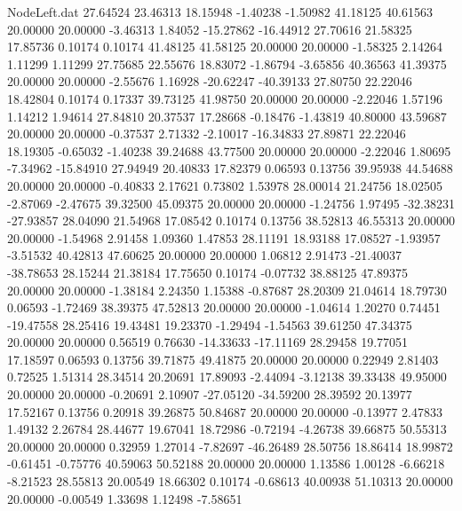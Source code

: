 \begin{filecontents}{NodeLeft.dat}
  27.64524   23.46313   18.15948    -1.40238   -1.50982   41.18125   40.61563   20.00000   20.00000   -3.46313    1.84052  -15.27862  -16.44912
  27.70616   21.58325   17.85736     0.10174    0.10174   41.48125   41.58125   20.00000   20.00000   -1.58325    2.14264    1.11299    1.11299
  27.75685   22.55676   18.83072    -1.86794   -3.65856   40.36563   41.39375   20.00000   20.00000   -2.55676    1.16928  -20.62247  -40.39133
  27.80750   22.22046   18.42804     0.10174    0.17337   39.73125   41.98750   20.00000   20.00000   -2.22046    1.57196    1.14212    1.94614
  27.84810   20.37537   17.28668    -0.18476   -1.43819   40.80000   43.59687   20.00000   20.00000   -0.37537    2.71332   -2.10017  -16.34833
  27.89871   22.22046   18.19305    -0.65032   -1.40238   39.24688   43.77500   20.00000   20.00000   -2.22046    1.80695   -7.34962  -15.84910
  27.94949   20.40833   17.82379     0.06593    0.13756   39.95938   44.54688   20.00000   20.00000   -0.40833    2.17621    0.73802    1.53978
  28.00014   21.24756   18.02505    -2.87069   -2.47675   39.32500   45.09375   20.00000   20.00000   -1.24756    1.97495  -32.38231  -27.93857
  28.04090   21.54968   17.08542     0.10174    0.13756   38.52813   46.55313   20.00000   20.00000   -1.54968    2.91458    1.09360    1.47853
  28.11191   18.93188   17.08527    -1.93957   -3.51532   40.42813   47.60625   20.00000   20.00000    1.06812    2.91473  -21.40037  -38.78653
  28.15244   21.38184   17.75650     0.10174   -0.07732   38.88125   47.89375   20.00000   20.00000   -1.38184    2.24350    1.15388   -0.87687
  28.20309   21.04614   18.79730     0.06593   -1.72469   38.39375   47.52813   20.00000   20.00000   -1.04614    1.20270    0.74451  -19.47558
  28.25416   19.43481   19.23370    -1.29494   -1.54563   39.61250   47.34375   20.00000   20.00000    0.56519    0.76630  -14.33633  -17.11169
  28.29458   19.77051   17.18597     0.06593    0.13756   39.71875   49.41875   20.00000   20.00000    0.22949    2.81403    0.72525    1.51314
  28.34514   20.20691   17.89093    -2.44094   -3.12138   39.33438   49.95000   20.00000   20.00000   -0.20691    2.10907  -27.05120  -34.59200
  28.39592   20.13977   17.52167     0.13756    0.20918   39.26875   50.84687   20.00000   20.00000   -0.13977    2.47833    1.49132    2.26784
  28.44677   19.67041   18.72986    -0.72194   -4.26738   39.66875   50.55313   20.00000   20.00000    0.32959    1.27014   -7.82697  -46.26489
  28.50756   18.86414   18.99872    -0.61451   -0.75776   40.59063   50.52188   20.00000   20.00000    1.13586    1.00128   -6.66218   -8.21523
  28.55813   20.00549   18.66302     0.10174   -0.68613   40.00938   51.10313   20.00000   20.00000   -0.00549    1.33698    1.12498   -7.58651

\end{filecontents}
